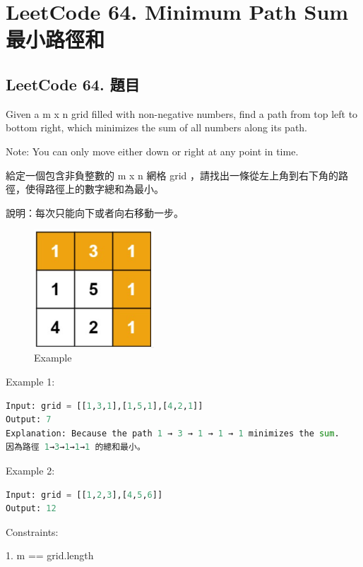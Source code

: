 \documentclass[10pt,UTF8]{ctexart}
\begin{document}
\newpage

\section{LeetCode 64. Minimum Path Sum 最小路徑和}

\subsection{LeetCode 64. 題目}

Given a m x n grid filled with non-negative numbers, find a path from top left to bottom right, which minimizes the sum of all numbers along its path.

Note: You can only move either down or right at any point in time.


給定一個包含非負整數的 m x n 網格 grid ，請找出一條從左上角到右下角的路徑，使得路徑上的數字總和為最小。

說明：每次只能向下或者向右移動一步。

\begin{figure}[H]
\centering 
\includegraphics[width=0.40\textwidth]{lc-64-p-example.png} 
\caption{Example}
\label{Test}
\end{figure}

Example 1:

\begin{lstlisting}[language={python}]
Input: grid = [[1,3,1],[1,5,1],[4,2,1]]
Output: 7
Explanation: Because the path 1 → 3 → 1 → 1 → 1 minimizes the sum.
因為路徑 1→3→1→1→1 的總和最小。
\end{lstlisting}

Example 2:

\begin{lstlisting}[language={python}]
Input: grid = [[1,2,3],[4,5,6]]
Output: 12
\end{lstlisting}

Constraints:

1. m == grid.length
\end{document}
